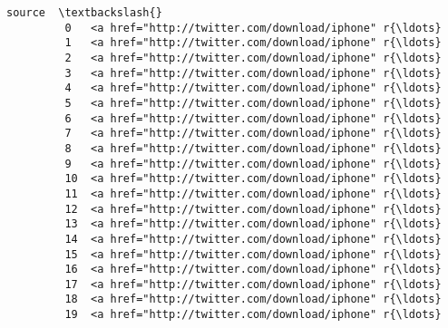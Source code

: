 \documentclass[11pt]{article}
\begin{document}
\begin{Verbatim}[commandchars=\\\{\}]
                                                        source  \textbackslash{}
         0   <a href="http://twitter.com/download/iphone" r{\ldots}   
         1   <a href="http://twitter.com/download/iphone" r{\ldots}   
         2   <a href="http://twitter.com/download/iphone" r{\ldots}   
         3   <a href="http://twitter.com/download/iphone" r{\ldots}   
         4   <a href="http://twitter.com/download/iphone" r{\ldots}   
         5   <a href="http://twitter.com/download/iphone" r{\ldots}   
         6   <a href="http://twitter.com/download/iphone" r{\ldots}   
         7   <a href="http://twitter.com/download/iphone" r{\ldots}   
         8   <a href="http://twitter.com/download/iphone" r{\ldots}   
         9   <a href="http://twitter.com/download/iphone" r{\ldots}   
         10  <a href="http://twitter.com/download/iphone" r{\ldots}   
         11  <a href="http://twitter.com/download/iphone" r{\ldots}   
         12  <a href="http://twitter.com/download/iphone" r{\ldots}   
         13  <a href="http://twitter.com/download/iphone" r{\ldots}   
         14  <a href="http://twitter.com/download/iphone" r{\ldots}   
         15  <a href="http://twitter.com/download/iphone" r{\ldots}   
         16  <a href="http://twitter.com/download/iphone" r{\ldots}   
         17  <a href="http://twitter.com/download/iphone" r{\ldots}   
         18  <a href="http://twitter.com/download/iphone" r{\ldots}   
         19  <a href="http://twitter.com/download/iphone" r{\ldots}   
         

\end{Verbatim}
\end{document}
